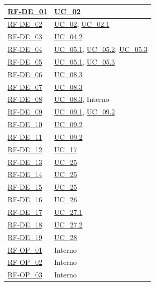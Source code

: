 \begin{longtable}{|>{\raggedright}p{}|>{\raggedright\arraybackslash}p{}|}
    \hyperlink{rf-de_1}{RF-DE\_01} & \hyperref[uc_02]{UC\_02} \\ \hline
    \hyperlink{rf-de_2}{RF-DE\_02} & \hyperref[uc_02]{UC\_02}, \hyperref[uc_02.1]{UC\_02.1} \\ \hline
    \hyperlink{rf-de_3}{RF-DE\_03} & \hyperref[uc_04.2]{UC\_04.2} \\ \hline
    \hyperlink{rf-de_4}{RF-DE\_04} & \hyperref[uc_05.1]{UC\_05.1}, \hyperref[uc_05.2]{UC\_05.2}, \hyperref[uc_05.3]{UC\_05.3} \\ \hline
    \hyperlink{rf-de_5}{RF-DE\_05} & \hyperref[uc_05.1]{UC\_05.1}, \hyperref[uc_05.3]{UC\_05.3} \\ \hline
    \hyperlink{rf-de_6}{RF-DE\_06} & \hyperref[uc_08.3]{UC\_08.3} \\ \hline
    \hyperlink{rf-de_7}{RF-DE\_07} & \hyperref[uc_08.3]{UC\_08.3} \\ \hline
    \hyperlink{rf-de_8}{RF-DE\_08} & \hyperref[uc_08.3]{UC\_08.3}, Interno \\ \hline
    \hyperlink{rf-de_9}{RF-DE\_09} & \hyperref[uc_09.1]{UC\_09.1}, \hyperref[uc_09.2]{UC\_09.2} \\ \hline
    \hyperlink{rf-de_10}{RF-DE\_10} & \hyperref[uc_09.2]{UC\_09.2} \\ \hline
    \hyperlink{rf-de_11}{RF-DE\_11} & \hyperref[uc_09.2]{UC\_09.2} \\ \hline
    \hyperlink{rf-de_12}{RF-DE\_12} & \hyperref[uc_17]{UC\_17} \\ \hline
    \hyperlink{rf-de_13}{RF-DE\_13} & \hyperref[uc_25]{UC\_25} \\ \hline
    \hyperlink{rf-de_14}{RF-DE\_14} & \hyperref[uc_25]{UC\_25} \\ \hline
    \hyperlink{rf-de_15}{RF-DE\_15} & \hyperref[uc_25]{UC\_25} \\ \hline
    \hyperlink{rf-de_16}{RF-DE\_16} & \hyperref[uc_26]{UC\_26} \\ \hline
    \hyperlink{rf-de_17}{RF-DE\_17} & \hyperref[uc_27.1]{UC\_27.1} \\ \hline
    \hyperlink{rf-de_18}{RF-DE\_18} & \hyperref[uc_27.2]{UC\_27.2} \\ \hline
    \hyperlink{rf-de_19}{RF-DE\_19} & \hyperref[uc_28]{UC\_28} \\ \hline
    
    \hyperlink{rf-op_1}{RF-OP\_01} & Interno \\ \hline
    \hyperlink{rf-op_2}{RF-OP\_02} & Interno \\ \hline
    \hyperlink{rf-op_3}{RF-OP\_03} & Interno \\ \hline


\end{longtable}
